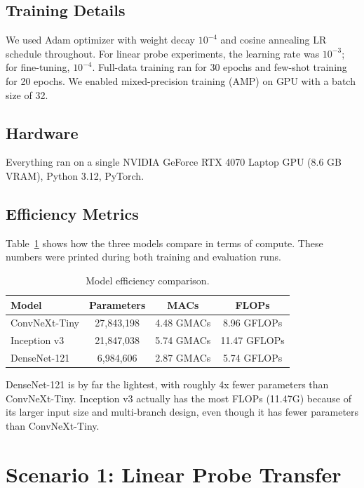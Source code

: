 \documentclass[11pt,a4paper]{article}
\begin{document}
\subsection{Training Details}

We used Adam optimizer with weight decay $10^{-4}$ and cosine annealing LR schedule throughout.
For linear probe experiments, the learning rate was $10^{-3}$; for fine-tuning, $10^{-4}$.
Full-data training ran for 30 epochs and few-shot training for 20 epochs.
We enabled mixed-precision training (AMP) on GPU with a batch size of 32.

\subsection{Hardware}

Everything ran on a single NVIDIA GeForce RTX 4070 Laptop GPU (8.6 GB VRAM), Python 3.12, PyTorch.

\subsection{Efficiency Metrics}
\label{sec:efficiency}

Table~\ref{tab:efficiency} shows how the three models compare in terms of compute.
These numbers were printed during both training and evaluation runs.

\begin{table}[H]
\centering
\caption{Model efficiency comparison.}
\label{tab:efficiency}
\begin{tabular}{lccc}
\toprule
\textbf{Model} & \textbf{Parameters} & \textbf{MACs} & \textbf{FLOPs} \\
\midrule
ConvNeXt-Tiny  & 27,843,198 & 4.48 GMACs & 8.96 GFLOPs \\
Inception v3   & 21,847,038 & 5.74 GMACs & 11.47 GFLOPs \\
DenseNet-121   &  6,984,606 & 2.87 GMACs & 5.74 GFLOPs \\
\bottomrule
\end{tabular}
\end{table}

DenseNet-121 is by far the lightest, with roughly 4x fewer parameters than ConvNeXt-Tiny.
Inception v3 actually has the most FLOPs (11.47G) because of its larger input size and multi-branch design, even though it has fewer parameters than ConvNeXt-Tiny.

\section{Scenario 1: Linear Probe Transfer}
\end{document}

